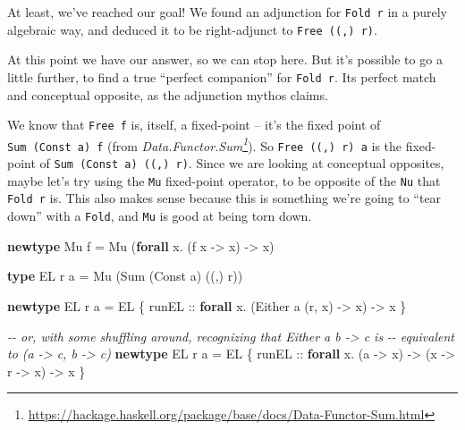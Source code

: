 \documentclass[]{article}
\newenvironment{Shaded}{}{}
\newcommand{\CommentTok}[1]{\textcolor[rgb]{0.38,0.63,0.69}{\textit{#1}}}
\newcommand{\DataTypeTok}[1]{\textcolor[rgb]{0.56,0.13,0.00}{#1}}
\newcommand{\KeywordTok}[1]{\textcolor[rgb]{0.00,0.44,0.13}{\textbf{#1}}}
\newcommand{\NormalTok}[1]{#1}
\newcommand{\OperatorTok}[1]{\textcolor[rgb]{0.40,0.40,0.40}{#1}}
\newcommand{\OtherTok}[1]{\textcolor[rgb]{0.00,0.44,0.13}{#1}}
\renewcommand{\href}[2]{#2\footnote{\url{#1}}}
\begin{document}
At least, we've reached our goal! We found an adjunction for \texttt{Fold\ r} in
a purely algebraic way, and deduced it to be right-adjunct to
\texttt{Free\ ((,)\ r)}.

At this point we have our answer, so we can stop here. But it's possible to go a
little further, to find a true ``perfect companion'' for \texttt{Fold\ r}. Its
perfect match and conceptual opposite, as the adjunction mythos claims.

We know that \texttt{Free\ f} is, itself, a fixed-point -- it's the fixed point
of \texttt{Sum\ (Const\ a)\ f} (from
\emph{\href{https://hackage.haskell.org/package/base/docs/Data-Functor-Sum.html}{Data.Functor.Sum}}).
So \texttt{Free\ ((,)\ r)\ a} is the fixed-point of
\texttt{Sum\ (Const\ a)\ ((,)\ r)}. Since we are looking at conceptual
opposites, maybe let's try using the \texttt{Mu} fixed-point operator, to be
opposite of the \texttt{Nu} that \texttt{Fold\ r} is. This also makes sense
because this is something we're going to ``tear down'' with a \texttt{Fold}, and
\texttt{Mu} is good at being torn down.

\begin{Shaded}
\begin{Highlighting}[]
\KeywordTok{newtype} \DataTypeTok{Mu}\NormalTok{ f }\OtherTok{=} \DataTypeTok{Mu}\NormalTok{ (}\KeywordTok{forall}\NormalTok{ x}\OperatorTok{.}\NormalTok{ (f x }\OtherTok{{-}>}\NormalTok{ x) }\OtherTok{{-}>}\NormalTok{ x)}

\KeywordTok{type} \DataTypeTok{EL}\NormalTok{ r a }\OtherTok{=} \DataTypeTok{Mu}\NormalTok{ (}\DataTypeTok{Sum}\NormalTok{ (}\DataTypeTok{Const}\NormalTok{ a) ((,) r))}

\KeywordTok{newtype} \DataTypeTok{EL}\NormalTok{ r a }\OtherTok{=} \DataTypeTok{EL}\NormalTok{ \{}
\OtherTok{    runEL ::} \KeywordTok{forall}\NormalTok{ x}\OperatorTok{.}\NormalTok{ (}\DataTypeTok{Either}\NormalTok{ a (r, x) }\OtherTok{{-}>}\NormalTok{ x) }\OtherTok{{-}>}\NormalTok{ x}
\NormalTok{  \}}

\CommentTok{{-}{-} or, with some shuffling around, recognizing that \textasciigrave{}Either a b {-}> c\textasciigrave{} is}
\CommentTok{{-}{-} equivalent to \textasciigrave{}(a {-}> c, b {-}> c)\textasciigrave{}}
\KeywordTok{newtype} \DataTypeTok{EL}\NormalTok{ r a }\OtherTok{=} \DataTypeTok{EL}\NormalTok{ \{}
\OtherTok{    runEL ::} \KeywordTok{forall}\NormalTok{ x}\OperatorTok{.}\NormalTok{ (a }\OtherTok{{-}>}\NormalTok{ x) }\OtherTok{{-}>}\NormalTok{ (x }\OtherTok{{-}>}\NormalTok{ r }\OtherTok{{-}>}\NormalTok{ x) }\OtherTok{{-}>}\NormalTok{ x}
\NormalTok{  \}}
\end{Highlighting}
\end{Shaded}
\end{document}

